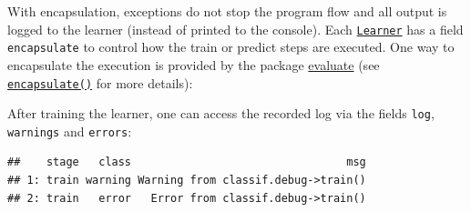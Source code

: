 \documentclass[]{article}
\newenvironment{Shaded}{\begin{snugshade}}{\end{snugshade}}
\newcommand{\DataTypeTok}[1]{\textcolor[rgb]{0.13,0.29,0.53}{#1}}
\newcommand{\DecValTok}[1]{\textcolor[rgb]{0.00,0.00,0.81}{#1}}
\newcommand{\KeywordTok}[1]{\textcolor[rgb]{0.13,0.29,0.53}{\textbf{#1}}}
\newcommand{\NormalTok}[1]{#1}
\newcommand{\OperatorTok}[1]{\textcolor[rgb]{0.81,0.36,0.00}{\textbf{#1}}}
\newcommand{\StringTok}[1]{\textcolor[rgb]{0.31,0.60,0.02}{#1}}
\renewenvironment{Shaded} {\begin{snugshade}\small} {\end{snugshade}}
\begin{document}
With encapsulation, exceptions do not stop the program flow and all output is logged to the learner (instead of printed to the console).
Each \href{https://mlr3.mlr-org.com/reference/Learner.html}{\texttt{Learner}} has a field \texttt{encapsulate} to control how the train or predict steps are executed.
One way to encapsulate the execution is provided by the package \href{https://cran.r-project.org/package=evaluate}{evaluate} (see \href{https://mlr3misc.mlr-org.com/reference/encapsulate.html}{\texttt{encapsulate()}} for more details):

\begin{Shaded}
\end{Shaded}

After training the learner, one can access the recorded log via the fields \texttt{log}, \texttt{warnings} and \texttt{errors}:

\begin{Shaded}
\end{Shaded}

\begin{verbatim}
##    stage   class                                 msg
## 1: train warning Warning from classif.debug->train()
## 2: train   error   Error from classif.debug->train()
\end{verbatim}

\begin{Shaded}
\end{Shaded}
\end{document}
